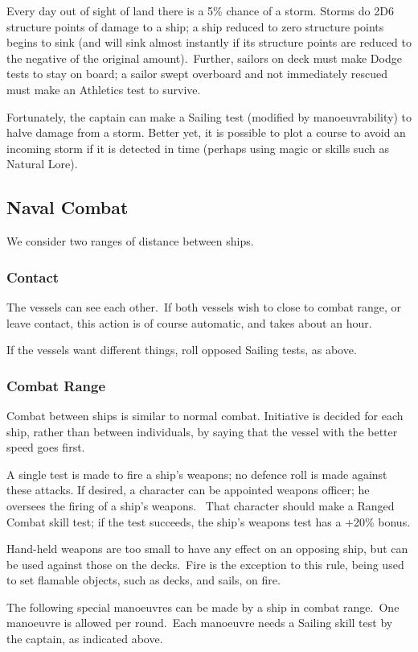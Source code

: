 Every day out of sight of land there is a 5\% chance of a storm. Storms do 2D6 structure points of damage to a ship; a ship reduced to zero structure points begins to sink (and will sink almost instantly if its structure points are reduced to the negative of the original amount). Further, sailors on deck must make Dodge tests to stay on board; a sailor swept overboard and not immediately rescued must make an Athletics test to survive.

Fortunately, the captain can make a Sailing test (modified by manoeuvrability) to halve damage from a storm. Better yet, it is possible to plot a course to avoid an incoming storm if it is detected in time (perhaps using magic or skills such as Natural Lore).

\subsection{Naval Combat}
We consider two ranges of distance between ships.

\subsubsection{Contact}
The vessels can see each other. If both vessels wish to close to combat range, or leave contact, this action is of course automatic, and takes about an hour.

If the vessels want different things, roll opposed Sailing tests, as above.

\subsubsection{Combat Range}
Combat between ships is similar to normal combat. Initiative is decided for each ship, rather than between individuals, by saying that the vessel with the better speed goes first.  

A single test is made to fire a ship’s weapons; no defence roll is made against these attacks. If desired, a character can be appointed weapons officer; he oversees the firing of a ship’s weapons.  That character should make a Ranged Combat skill test; if the test succeeds, the ship’s weapons test has a +20\% bonus.

Hand-held weapons are too small to have any effect on an opposing ship, but can be used against those on the decks. Fire is the exception to this rule, being used to set flamable objects, such as decks, and sails, on fire.

The following special manoeuvres can be made by a ship in combat range. One manoeuvre is allowed per round. Each manoeuvre needs a Sailing skill test by the captain, as indicated above.


